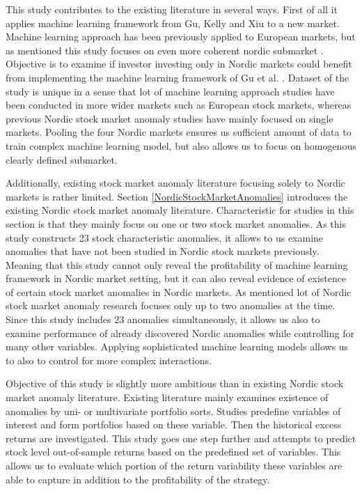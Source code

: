 \documentclass{article}
\begin{document}

This study contributes to the existing literature in several ways. First of all it applies machine learning framework from Gu, Kelly and Xiu \citeyear{guetal} to a new market. Machine learning approach has been previously applied to European markets, but as mentioned this study focuses on even more coherent nordic submarket \cite{Drobetz, Fieberg}. Objective is to examine if investor investing only in Nordic markets could benefit from implementing the machine learning framework of Gu et al. \citeyear{guetal}. Dataset of the study is unique in a sense that lot of machine learning approach studies have been conducted in more wider markets such as European stock markets, whereas previous Nordic stock market anomaly studies have mainly focused on single markets. Pooling the four Nordic markets ensures us sufficient amount of data to train complex machine learning model, but also allows us to focus on homogenous clearly defined submarket. \par

Additionally, existing stock market anomaly literature focusing solely to Nordic markets is rather limited. Section \ref{NordicStockMarketAnomalies} introduces the existing Nordic stock market anomaly literature. Characteristic for studies in this section is that they mainly focus on one or two stock market anomalies. As this study constructs 23 stock characteristic anomalies, it allows to us examine anomalies that have not been studied in Nordic stock markets previously. Meaning that this study cannot only reveal the profitability of machine learning framework in Nordic market setting, but it can also reveal evidence of existence of certain stock market anomalies in Nordic markets. As mentioned lot of Nordic stock market anomaly research focuses only up to two anomalies at the time. Since this study includes 23 anomalies simultaneously, it allows us also to examine performance of already discovered Nordic anomalies while controlling for many other variables. Applying sophisticated machine learning models allows us to also to control for more complex interactions. \par

Objective of this study is slightly more ambitious than in existing Nordic stock market anomaly literature. Existing literature mainly examines existence of anomalies by uni- or multivariate portfolio sorts. Studies predefine variables of interest and form portfolios based on these variable. Then the historical excess returns are investigated. This study goes one step further and attempts to predict stock level out-of-sample returns based on the predefined set of variables. This allows us to evaluate which portion of the return variability these variables are able to capture in addition to the profitability of the strategy. \par
\end{document}
